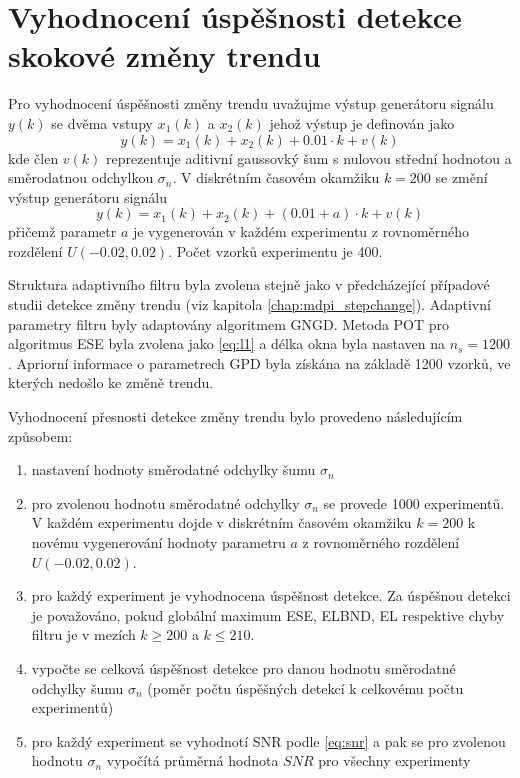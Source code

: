 \section{Vyhodnocení úspěšnosti detekce skokové změny trendu}\label{chap:mdpi_trendchange_evaluation}
Pro vyhodnocení úspěšnosti změny trendu uvažujme výstup generátoru signálu $y(k)$ se dvěma vstupy $x_1(k)$ a $x_2(k)$ jehož výstup je definován jako
\begin{equation}\label{eq:trnd_stats}
    y(k) = x_1(k) + x_2(k) + 0.01 \cdot k + v(k)
\end{equation}
kde člen $v(k)$ reprezentuje aditivní gaussovký šum s nulovou střední hodnotou a směrodatnou odchylkou $\sigma_n$. V diskrétním časovém okamžiku $k=200$ se změní výstup generátoru signálu
\begin{equation}
    y(k) = x_1(k) + x_2(k) + (0.01 + a) \cdot k + v(k)
\end{equation}
přičemž parametr $a$ je vygenerován v každém experimentu z rovnoměrného rozdělení $U(-0.02,0.02)$. Počet vzorků experimentu je 400.
\par 
Struktura adaptivního filtru byla zvolena stejně jako v předcházející případové studii detekce změny trendu (viz kapitola \ref{chap:mdpi_stepchange}). Adaptivní parametry filtru byly adaptovány algoritmem GNGD. Metoda POT pro algoritmus ESE byla zvolena jako \ref{eq:l1} a délka okna byla nastaven na $n_s=1200$. Apriorní informace o parametrech GPD byla získána na základě 1200 vzorků, ve kterých nedošlo ke změně trendu. 
\par 
Vyhodnocení přesnosti detekce změny trendu bylo provedeno následujícím způsobem:
\begin{enumerate}
\item nastavení hodnoty směrodatné odchylky šumu $\sigma_n$
\item pro zvolenou hodnotu směrodatné odchylky $\sigma_n$ se provede 1000 experimentů. V každém experimentu dojde v diskrétním časovém okamžiku $k=200$ k  novému vygenerování hodnoty parametru $a$ z rovnoměrného rozdělení $U(-0.02,0.02)$.
\item pro každý experiment je vyhodnocena úspěšnost detekce. Za úspěšnou detekci je považováno, pokud globální maximum ESE, ELBND, EL respektive chyby filtru je v mezích $k\geq 200$ a $k\leq 210$. 
\item vypočte se celková úspěšnost detekce pro danou hodnotu směrodatné odchylky šumu $\sigma_n$ (poměr počtu úspěšných detekcí k celkovému počtu experimentů)
\item pro každý experiment se vyhodnotí SNR podle \ref{eq:snr} a pak se pro zvolenou hodnotu $\sigma_n$ vypočítá průměrná hodnota $SNR$ pro všechny experimenty
\end{enumerate}

